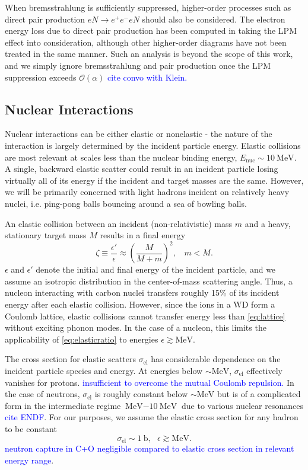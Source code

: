 \documentclass[twocolumn,showpacs,preprintnumbers,amsmath,amssymb,prd]{revtex4}
\newcommand{\OO}{\mathcal{O}}
\def\r{\right)}
\def\l{\left(}
\begin{document}
\begin{appendices}
When bremsstrahlung is sufficiently suppressed, higher-order processes such as direct pair production $e N \rightarrow e^+ e^- e N$ should also be considered. The electron energy loss due to direct pair production has been computed in \cite{Gerhardt:2010bj} taking the LPM effect into consideration, although other higher-order diagrams have not been treated in the same manner. Such an analysis is beyond the scope of this work, and we simply ignore bremsstrahlung and pair production once the LPM suppression exceeds $\OO(\alpha)$ \textcolor{blue}{cite convo with Klein.}

\subsection*{Nuclear Interactions}
Nuclear interactions can be either elastic or nonelastic - the nature of the interaction is largely determined by the incident particle energy. Elastic collisions are most relevant at scales less than the nuclear binding energy, $E_\text{nuc} \sim 10 ~\text{MeV}$. A single, backward elastic scatter could result in an incident particle losing virtually all of its energy if the incident and target masses are the same. However, we will be primarily concerned with light hadrons incident on relatively heavy nuclei, i.e. ping-pong balls bouncing around a sea of bowling balls.

An elastic collision between an incident (non-relativistic) mass $m$ and a heavy, stationary target mass $M$ results in a final energy
\begin{equation}
\label{eq:elasticratio}
\zeta \equiv \frac{\epsilon'}{\epsilon} \approx \l \frac{M}{M+m} \r^2, ~~~~ m < M.
\end{equation}
$\epsilon$ and $\epsilon'$ denote the initial and final energy of the incident particle, and we assume an isotropic distribution in the center-of-mass scattering angle. Thus, a nucleon interacting with carbon nuclei transfers roughly 15\% of its incident energy after each elastic collision. However, since the ions in a WD form a Coulomb lattice, elastic collisions cannot transfer energy less than \eqref{eq:lattice} without exciting phonon modes. In the case of a nucleon, this limits the applicability of \eqref{eq:elasticratio} to energies $\epsilon \gtrsim \text{MeV}$.


The cross section for elastic scatters $\sigma_\text{el}$ has considerable dependence on the incident particle species and energy. At energies below $\sim \text{MeV}$, $\sigma_\text{el}$ effectively vanishes for protons. \textcolor{blue}{insufficient to overcome the mutual Coulomb repulsion.} In the case of neutrons, $\sigma_\text{el}$ is roughly constant below $\sim \text{MeV}$ but is of a complicated form in the intermediate regime $\text{MeV} - \text{10} ~\text{MeV}$ due to various nuclear resonances \textcolor{blue}{cite ENDF}. For our purposes, we assume the elastic cross section for any hadron to be constant 
\begin{equation}
\sigma_\text{el} \sim 1 ~\text{b}, ~~~ \epsilon \gtrsim \text{MeV}.
\end{equation}
\textcolor{blue}{neutron capture in C+O negligible compared to elastic cross section in relevant energy range}. 


\end{appendices}
\end{document}
